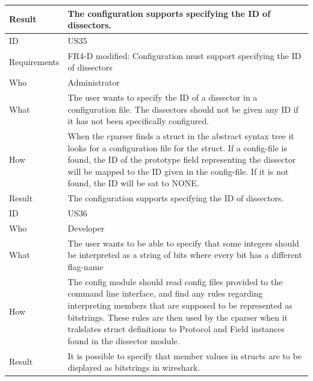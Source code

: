 \begin{table}[htbp]
{\begin{tabularx}{1.2\textwidth}{l X}
	Result & The configuration supports specifying the ID of dissectors. \\
	\bottomrule
	ID & US35 \\
	Requirements & FR4-D modified: Configuration must support specifying the ID of dissectors \\
	Who & Administrator \\
	What & The user wants to specify the ID of a dissector in a configuration file. The dissectors should not be given any ID if it has not been 			specifically configured. \\
	How & When the cparser finds a struct in the abstract syntax tree it looks for a configuration file for the struct. If a config-file is found, the 			ID of the prototype field representing the dissector will be mapped to the ID given in the config-file.  If it is not found, the ID will be sat to 			NONE. \\
	Result & The configuration supports specifying the ID of dissectors. \\
	\midrule
	ID & US36\\
	Who &  Developer\\
	What & The user wants to be able to specify that some integers should be interpreted as a string of bits where every bit has a different flag-name\\
	How & The config module should read config files provided to the command line interface, and find any rules regarding interpreting members that are supposed to be represented as bitstrings. These rules are then used by the cparser when it tralslates struct definitions to Protocol and Field instances found in the dissector module.\\
	Result & It is possible to specify that member values in structs are to be displayed as bitstrings in wireshark.\\
	\bottomrule
\end{tabularx}}
\end{table}

